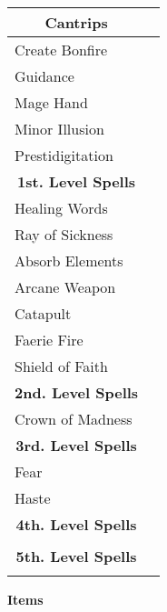 \documentclass[11pt]{article}
\newcommand{\done}{\rlap{$\square$}{\raisebox{2pt}{\large\hspace{1pt}\ding{51}}}}
\begin{document}
	\begin{tabularx}{\textwidth}{X|r}
\multicolumn{1}{c|}{\large \textbf{Cantrips}} 	& 	\\
\hline
Create Bonfire 									& 	\\
Guidance 										& 	\\
Mage Hand										&	\\
Minor Illusion									&	\\
Prestidigitation								&	\\

\multicolumn{1}{c|}{\large \textbf{1st. Level Spells}} & \\
\hline
Healing Words									& \done \\
Ray of Sickness									& \done \\
Absorb Elements	 								& \done \\
Arcane Weapon									& \done \\
Catapult										& \done \\
Faerie Fire 									& \done \\
Shield of Faith		 							& \done \\

\multicolumn{1}{c|}{\large \textbf{2nd. Level Spells}} &	\\
\hline
Crown of Madness								& \done \\

\multicolumn{1}{c|}{\large \textbf{3rd. Level Spells}} & \\
\hline
Fear 											& \done \\
Haste											& \done	\\

\multicolumn{1}{c|}{\large \textbf{4th. Level Spells}} & \\
\hline
 												&  	\\

\multicolumn{1}{c|}{\large \textbf{5th. Level Spells}} & \\
\hline
	 											&
	\end{tabularx}

\clearpage

	\begin{center}
{\LARGE \textbf{Items}}
	\end{center}
\end{document}
